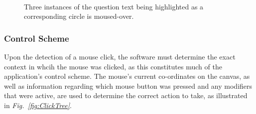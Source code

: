 \documentclass[12pt,twoside,notitlepage,xetex]{report}
\begin{document}
\begin{center}
\begin{figure}[H]
\begin{center}
\\
\vspace{0.5cm}
\end{center}
\caption{Three instances of the question text being highlighted as a corresponding circle is moused-over.}
\label{fig:Highlighting}
\end{figure}
\end{center}

\subsubsection{Control Scheme}

Upon the detection of a mouse click, the software must determine the exact context in whcih the mouse was clicked, as this constitutes much of the application's control scheme.  The mouse's current co-ordinates on the canvas, as well as information regarding which mouse button was pressed and any modifiers that were active, are used to determine the correct action to take, as illustrated in \emph{Fig.~\ref{fig:ClickTree}}.
\end{document}
